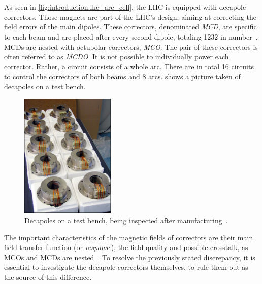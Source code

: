 \section{}
\label{section:decapoles:chromaticity}

As seen in \cref{fig:introduction:lhc_arc_cell}, the LHC is equipped with decapole correctors. Those
magnets are part of the LHC's design, aiming at correcting the field errors of the main
dipoles. These correctors, denominated \textit{MCD}, are specific to each beam and are placed after
every second dipole, totaling 1232 in number~\cite{venturini_delsolaro_magnetic_2005}.  MCDs are
nested with octupolar correctors, \textit{MCO}. The pair of these correctors is often referred to as
\textit{MCDO}. 
It is not possible to individually power each corrector. Rather, a circuit consists of a whole arc.
There are in total 16 circuits to control the correctors of both beams and 8 arcs.
 shows a picture taken of decapoles on a test bench.

\begin{figure}
    \centering
    \includegraphics[width=0.4\textwidth]{./images/decapoles_real_pic.jpg}
    \caption{Decapoles on a test bench, being inspected after
    manufacturing~\cite{noauthor_ten_2001}.}
    \label{fig:decapoles:decapole_picture}
\end{figure}

The important characteristics of the magnetic fields of correctors are their main field transfer
function (or \textit{response}), the field quality and possible crosstalk, as MCOs and MCDs are
nested~\cite{venturini_delsolaro_magnetic_2005}. To resolve the previously stated discrepancy, it is
essential to investigate the decapole correctors themselves, to rule them out as the source of this
difference.

